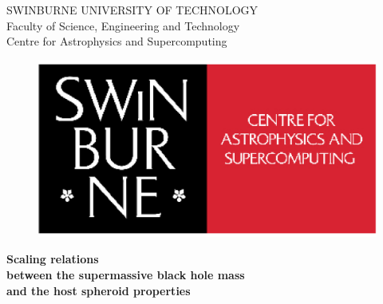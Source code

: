 
\pagestyle{empty}



\begin{titlepage}
\linespread{1.3}
\begin{center}
\vspace{-1cm}
{SWINBURNE UNIVERSITY OF TECHNOLOGY \\
Faculty of Science, Engineering and Technology \\
Centre for Astrophysics and Supercomputing } \\ 

\medskip

\end{center}


\vspace{0.5cm}
\begin{figure}[htb]
\begin{center}
\includegraphics[scale=0.25]{images/swincaslogo.eps}
\end{center}
\end{figure}

\vspace{-0.5cm}

\begin{center}
\LARGE{
\bf{Scaling relations \\between the supermassive black hole mass \\and the host spheroid properties}
}
\end{center}



\end{titlepage}

